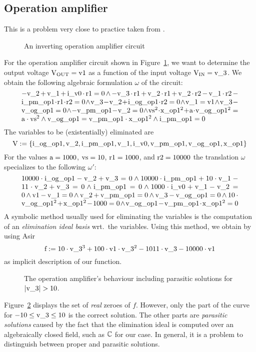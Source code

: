 \subsection{Operation amplifier}
This is a problem very close to practice taken from \cite{Henning:91}. 
\begin{figure}
\centerline{}
\caption{An inverting operation amplifier circuit\label{opampfig}}
\end{figure}
For the operation amplifier circuit shown in Figure~\ref{opampfig}, we
want to determine the output voltage $\rm V_{OUT}=v1$ as a function of
the input voltage $\rm V_{IN}=v\_3$. We obtain the following algebraic
formulation $\omega$ of the circuit:
$$\vbox{\hsize=0.9\textwidth\noindent$\rm -v\_2+v\_1+i\_v0\cdot r1=0
\land -v\_3\cdot r1+v\_2\cdot r1+v\_2\cdot r2-v\_1\cdot
r2-i\_pm\_op1\cdot r1\cdot r2=0 \land v\_3-v\_2+i\_og\_op1\cdot r2=0
\land v\_1=v1 \land v\_3-v\_og\_op1=0 \land - v\_pm\_op1-v\_2=0 \land
vs^2\cdot x\_op1^2+a\cdot v\_og\_op1^2=a\cdot vs^2 \land
v\_og\_op1=v\_pm\_op1\cdot x\_op1^2 \land i\_pm\_op1=0$}
$$
The variables to be (existentially) eliminated are
$$\rm
V:=\{i\_og\_op1, v\_2, i\_pm\_op1, v\_1, i\_v0, v\_pm\_op1, v\_og\_op1 ,
x\_op1\}
$$
For the values $\rm a=1000$, $\rm vs=10$, $\rm r1=1000$, and $\rm
r2=10000$ the translation $\omega$ specializes to the following
$\omega'$:
$$\vbox{\hsize=0.9\textwidth\noindent$\rm
10000\cdot i\_og\_op1 - v\_2 + v\_3 = 0 \land 10000\cdot i\_pm\_op1 +
10\cdot v\_1 - 11\cdot v\_2 + v\_3 = 0 \land i\_pm\_op1 = 0 \land
1000\cdot i\_v0 + v\_1 - v\_2 = 0 \land v1 - v\_1 = 0 \land v\_2 +
v\_pm\_op1 = 0 \land v\_3 - v\_og\_op1 = 0 \land 10\cdot v\_og\_op1^2
+ x\_op1^2 - 1000 = 0 \land v\_og\_op1 - v\_pm\_op1\cdot x\_op1^2 =
0$}
$$
A symbolic method usually used for eliminating the variables is the
computation of an {\em elimination ideal basis} wrt.~the variables. 
Using this method, we obtain by using Asir
$$\rm
f:=10\cdot v\_3^3+100\cdot v1\cdot v\_3^2-1011\cdot v\_3-10000\cdot v1
$$
as implicit description of our function.
\begin{figure}
\centerline{}
\caption{The operation amplifier's behaviour including parasitic
solutions for $\rm |v\_3|>10$.\label{solfig}}
\end{figure}
Figure~\ref{solfig} displays the set of {\em real} zeroes of $f$. 
However, only the part of the curve for $\rm -10\leq v\_3\leq10$ is
the correct solution. The other parts are {\em parasitic solutions}
caused by the fact that the elimination ideal is computed over an
algebraically closed field, such as $\Bbb C$ for our case. In general, 
it is a problem to distinguish between proper and parasitic solutions.

